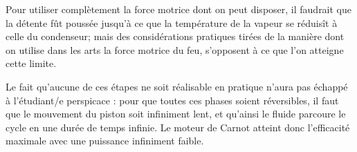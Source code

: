 			Pour utiliser complètement la force motrice dont on peut disposer, il faudrait que la détente fût poussée jusqu’à ce que la température de la vapeur se réduisît à celle du condenseur; mais des considérations pratiques tirées de la manière dont on utilise dans les arts la force motrice du feu, s’opposent à ce que l’on atteigne cette limite.

		Le fait qu’aucune de ces étapes ne soit réalisable en pratique n’aura pas échappé à l’étudiant/e perspicace : pour que toutes ces phases soient réversibles, il faut que le mouvement du piston soit infiniment lent, et qu'ainsi le fluide parcoure le cycle en une durée de temps infinie. Le moteur de Carnot atteint donc l’efficacité maximale avec une puissance infiniment faible.
		
